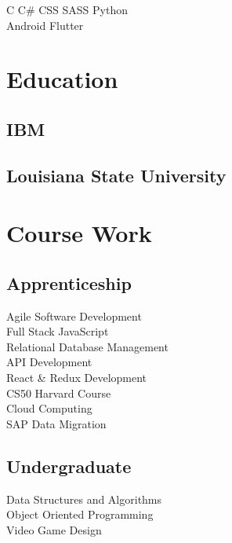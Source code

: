\documentclass[]{deedy-resume-openfont}
\begin{document}
\begin{minipage}[t]{0.33\textwidth}
\vspace{\topsep} %
C \textbullet{} C\# \textbullet{} CSS \textbullet{} SASS \textbullet{} Python \\
Android \textbullet{} Flutter \textbullet{}

\sectionsep




\section{Education} 

\subsection{IBM}
\sectionsep

\subsection{Louisiana State University}
\sectionsep
\section{Course Work}

\subsection{Apprenticeship}
Agile Software Development  \\
Full Stack JavaScript \\
Relational Database Management \\
API Development \\
React & Redux Development \\
CS50 Harvard Course \\
Cloud Computing \\
SAP Data Migration \\
\vspace{\topsep} %
\subsection{Undergraduate}
Data Structures and Algorithms \\
Object Oriented Programming  \\
Video Game Design \\

%
%

\end{minipage} 
\end{document}
